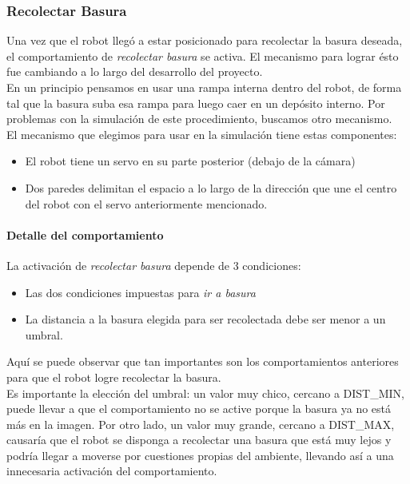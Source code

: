 \subsubsection{Recolectar Basura}
\label{collect_garbage}
Una vez que el robot lleg\'o a estar posicionado para recolectar la basura
deseada, el comportamiento de \emph{recolectar basura} se activa. El mecanismo
para lograr \'esto fue cambiando a lo largo del desarrollo del proyecto.
\\\indent
En un principio pensamos en usar una rampa interna dentro del robot, de forma
tal que la basura suba esa rampa para luego caer en un dep\'osito interno.
Por problemas con la simulaci\'on de este procedimiento, buscamos otro
mecanismo.
\\\indent
El mecanismo que elegimos para usar en la simulaci\'on tiene estas componentes:
\begin{itemize}
	\item El robot tiene un servo en su parte posterior (debajo de la c\'amara)
	\item Dos paredes delimitan el espacio a lo largo de la direcci\'on que une
			el centro del robot con el servo anteriormente mencionado.
\end{itemize}

\paragraph{Detalle del comportamiento}
La activaci\'on de \emph{recolectar basura} depende de 3 condiciones:
\begin{itemize}
	\item Las dos condiciones impuestas para \emph{ir a basura}
	\item La distancia a la basura elegida para ser recolectada debe ser menor a
			un umbral.
\end{itemize}

Aqu\'i se puede observar que tan importantes son los comportamientos anteriores
para que el robot logre recolectar la basura.
\\\indent
Es importante la elecci\'on del umbral: un valor muy chico, cercano a DIST\_MIN,
puede llevar a que el comportamiento no se active porque la basura ya no est\'a
m\'as en la imagen. Por otro lado, un valor muy grande, cercano a DIST\_MAX, 
causar\'ia que el robot se disponga a recolectar una basura que est\'a muy lejos
y podr\'ia llegar a moverse por cuestiones propias del ambiente, llevando as\'i
a una innecesaria activaci\'on del comportamiento.

